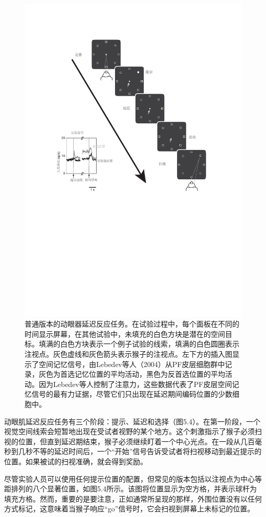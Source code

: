 \begin{figure}
	\centering
	\includegraphics[width=0.7\linewidth]{image_pfc/Fig_5_4}
	\caption{普通版本的动眼器延迟反应任务。在试验过程中，每个面板在不同的时间显示屏幕，在其他试验中，未填充的白色方块是潜在的空间目标。填满的白色方块表示一个例子试验的线索，填满的白色圆圈表示注视点。灰色虚线和灰色箭头表示猴子的注视点。左下方的插入图显示了空间记忆信号，由Lebedev等人（2004）从PF皮层细胞群中记录，灰色为首选记忆位置的平均活动，黑色为反首选位置的平均活动。因为Lebedev等人控制了注意力，这些数据代表了PF皮层空间记忆信号的最有力证据，尽管它们只出现在延迟期间编码位置的少数细胞中。}
	\label{fig:fig}
\end{figure}

动眼肌延迟反应任务有三个阶段：提示、延迟和选择（图5.4）。在第一阶段，一个视觉空间线索会短暂地出现在受试者视野的某个地方。这个刺激指示了猴子必须扫视的位置，但直到延迟期结束，猴子必须继续盯着一个中心光点。在一段从几百毫秒到几秒不等的延迟时间后，一个“开始”信号告诉受试者将扫视移动到最近提示的位置。如果被试的扫视准确，就会得到奖励。

尽管实验人员可以使用任何提示位置的配置，但常见的版本包括以注视点为中心等距排列的八个显著位置，如图5.4所示。该图将位置显示为空方格，并表示球杆为填充方格。然而，重要的是要注意，正如通常所呈现的那样，外围位置没有以任何方式标记，这意味着当猴子响应“go”信号时，它会扫视到屏幕上未标记的位置。

